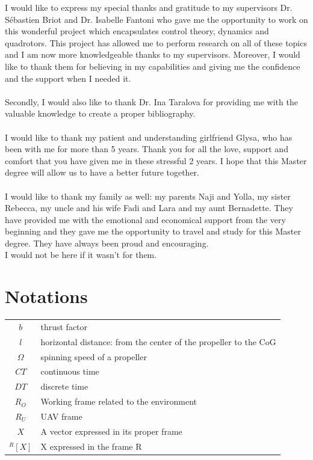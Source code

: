 \documentclass{thesisreport}
\begin{document}
I would like to express my special thanks and gratitude to my supervisors Dr. Sébastien Briot and Dr. Isabelle Fantoni who gave me the  opportunity to work on this wonderful project which encapsulates control theory, dynamics and quadrotors. This project has allowed me to perform research on all of these topics and I am now more knowledgeable thanks to my supervisors. Moreover, I would like to thank them for believing in my capabilities and giving me the confidence and the support when I needed it. \\\\
Secondly, I would also like to thank Dr. Ina Taralova for providing me with the valuable knowledge to create a proper bibliography. \\\\
I would like to thank my patient and understanding girlfriend Glysa, who has been with me for more than 5 years. Thank you for all the love, support and comfort that you have given me in these stressful 2 years. I hope that this Master degree will allow us to have a better future together. \\\\
I would like to thank my family as well: my parents Naji and Yolla, my sister Rebecca, my uncle and his wife Fadi and Lara and my aunt Bernadette. They have provided me with the emotional and economical support from the very beginning and they gave me the opportunity to travel and study for this Master degree. They have always been proud and encouraging. \\I would not be here if it wasn't for them.

 
 \newpage
 
 
 \section*{Notations}
 \begin{tabular}{cp{}}
  $b$ & thrust factor \\
  $l$ & horizontal distance: from the center of the propeller to the CoG \\
  $\Omega$ & spinning speed of a propeller\\
  $CT$ & continuous time \\
  $DT$ & discrete time \\
  $R_O$ & Working frame related to the environment\\
  $R_U$ & UAV frame\\
  $X$ & A vector expressed in its proper frame\\
  ${}^{R}[X]$ & X expressed in the frame R\\

\end{tabular}\\
 
\end{document}
